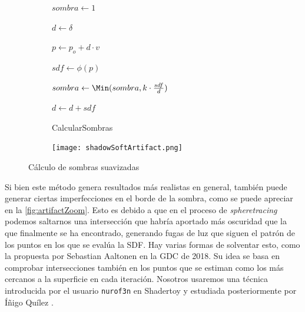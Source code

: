 \begin{figure}[ht!]
    \centering
    \begin{subfigure}[b]{0.50\textwidth}
       \begin{algorithm}[H]
            \caption{CalcularSombras}
                $sombra \gets 1$
                
                $d \gets \delta$ 
                
                 {
                    $p \gets p_o + d \cdot v$
                    
                    $sdf \gets \phi(p)$
                    
                    $sombra \gets \Min(sombra, k\cdot \frac{sdf}{d})$
                    
                    $d \gets d + sdf$

                }

        \end{algorithm}
    \end{subfigure}%
    \hfill
    \begin{subfigure}[b]{0.48\textwidth}
        \texttt{[image: shadowSoftArtifact.png]}
    \end{subfigure}
    \caption{Cálculo de sombras suavizadas}
    \label{fig:sombras2}
\end{figure}

Si bien este método genera resultados más realistas en general, también puede generar ciertas imperfecciones en el borde de la sombra, como se puede apreciar en la \autoref{fig:artifactZoom}. Esto es debido a que en el proceso de \textit{spheretracing} podemos saltarnos una intersección que habría aportado más oscuridad que la que finalmente se ha encontrado, generando fugas de luz que siguen el patrón de los puntos en los que se evalúa la SDF. Hay varias formas de solventar esto, como la propuesta por Sebastian Aaltonen \cite{claybook} en la GDC de 2018. Su idea se basa en comprobar intersecciones también en los puntos que se estiman como los más cercanos a la superficie en cada iteración. Nosotros usaremos una técnica introducida por el usuario \texttt{nurof3n} \cite{shadertoy-sombras} en Shadertoy y estudiada posteriormente por Íñigo Quílez \cite{article:shadow}.\newline

